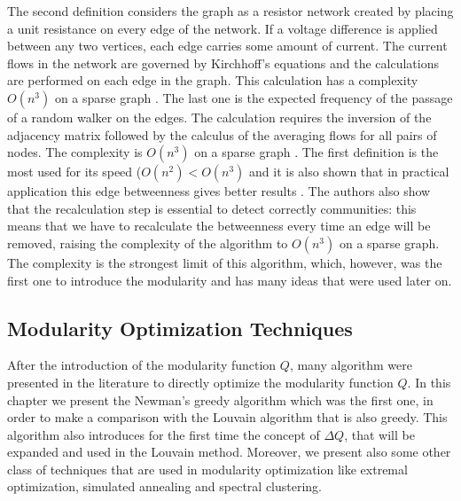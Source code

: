 The second definition considers the graph as a resistor network created by placing a unit resistance on every edge of the network.
If a voltage difference is applied between any two vertices, each edge carries some amount of current.
The current flows in the network are governed by Kirchhoff’s equations and the calculations are performed on each edge in the graph.
This calculation has a complexity $O(n^3)$ on a sparse graph \cite{Newman_2004}. 
The last one is the expected frequency of the passage of a random walker on the edges. The calculation requires the inversion of the adjacency matrix followed by the calculus of the averaging flows for all pairs of nodes. The complexity is $O(n^3)$ on a sparse graph \cite{Newman_2004}. 
The first definition is the most used for its speed ($O(n^2) < O(n^3)$ and it is also shown that in practical application this edge betweenness gives better results \cite{Newman_2004}. The authors also show that the recalculation step is essential to detect correctly communities: this means that we have to recalculate the betweenness every time an edge will be removed, raising the complexity of the algorithm to $O(n^3)$ on a sparse graph. The complexity is the strongest limit of this algorithm, which, however, was the first one to introduce the modularity and has many ideas that were used later on.
\subsection{Modularity Optimization Techniques}
After the introduction of the modularity function $Q$, many algorithm were presented in the literature to directly optimize the modularity function $Q$. In this chapter we present the Newman's greedy algorithm which was the first one, in order to make a comparison with the Louvain algorithm that is also greedy. This algorithm also introduces for the first time the concept of $\Delta Q$, that will be expanded and used in the Louvain method. Moreover, we present also some other class of techniques that are used in modularity optimization like extremal optimization, simulated annealing and spectral clustering.
